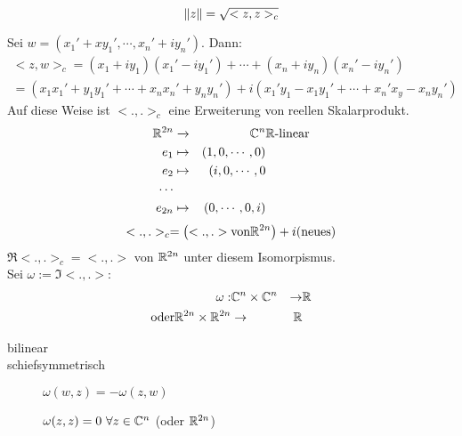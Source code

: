 \begin{Def}
  \[\left\| z \right\|=\sqrt{<z,z>_c}\]
\end{Def}
\begin{Bem}
  Sei $w=(x_1'+xy_1',\cdots,x_n'+iy_n')$. Dann:
  \begin{align*}
    <z,w>_c=(x_1+iy_1)(x_1'-iy_1')+\cdots+(x_n+iy_n)(x_n'-iy_n')\\
    =(x_1x_1'+y_1y_1'+\cdots+x_nx_n'+y_ny_n')+i(x_1'y_1-x_1y_1'+\cdots+x_n'x_y-x_ny_n')
  \end{align*}
  Auf diese Weise ist $<.,.>_c$ eine Erweiterung von reellen Skalarprodukt.
  \begin{align*}
    \mathbb{R}^{2n}&\xrightarrow{~}&\mathbb{C}^n&\mathbb{R}\text{-linear}\\
    e_1&\mapsto&(1,0,\cdots,0)\\
    e_2&\mapsto&(i,0,\cdots,0\\
    \cdots\\
    e_{2n}&\mapsto&(0,\cdots,0,i)
  \end{align*}
  \[<.,.>_c=\left( <.,.> \text{von} \mathbb{R}^{2n} \right) + i(\text{neues})\]
  $\Re<.,.>_c=<.,.>$ von $\mathbb{R}^{2n}$ unter diesem Isomorpismus.\\
  Sei $\omega:=\Im<.,.>$:
  \begin{align*}
    \omega:&\mathbb{C}^n\times\mathbb{C}^n&\to&\mathbb{R}\\
    \text{oder}\mathbb{R}^{2n}\times\mathbb{R}^{2n}&\to&\mathbb{R}
  \end{align*}
\end{Bem}
\begin{Eig}
  \begin{description}
    \item[bilinear]
    \item[schiefsymmetrisch] $\omega(w,z)=-\omega(z,w)$
    \item[] $\omega(z,z)=0\ \forall z\in\mathbb{C}^n$ (oder $\mathbb{R}^{2n}$)
  \end{description}
\end{Eig}
